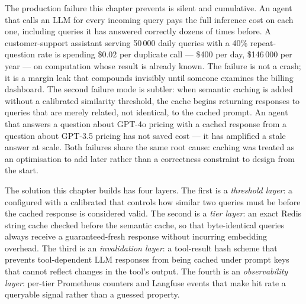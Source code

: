 

The production failure this chapter prevents is silent and cumulative. An
agent that calls an LLM for every incoming query pays the full inference
cost on each one, including queries it has answered correctly dozens of
times before. A customer-support assistant serving 50\,000 daily queries
with a 40\% repeat-question rate is spending \$0.02 per duplicate call
--- \$400 per day, \$146\,000 per year --- on computation whose result is
already known. The failure is not a crash; it is a margin leak that
compounds invisibly until someone examines the billing dashboard. The
second failure mode is subtler: when semantic caching is added without a
calibrated similarity threshold, the cache begins returning responses to
queries that are merely related, not identical, to the cached prompt. An
agent that answers a question about GPT-4o pricing with a cached response
from a question about GPT-3.5 pricing has not saved cost --- it has
amplified a stale answer at scale. Both failures share the same root
cause: caching was treated as an optimisation to add later rather than a
correctness constraint to design from the start.

The solution this chapter builds has four layers. The first is a
\emph{threshold layer}: a  configured with a
calibrated  that controls how similar two queries
must be before the cached response is considered valid. The second is a
\emph{tier layer}: an exact Redis string cache checked before the
semantic cache, so that byte-identical queries always receive a
guaranteed-fresh response without incurring embedding overhead. The third
is an \emph{invalidation layer}: a tool-result hash scheme that prevents
tool-dependent LLM responses from being cached under prompt keys that
cannot reflect changes in the tool's output. The fourth is an
\emph{observability layer}: per-tier Prometheus counters and Langfuse
events that make hit rate a queryable signal rather than a guessed
property.

